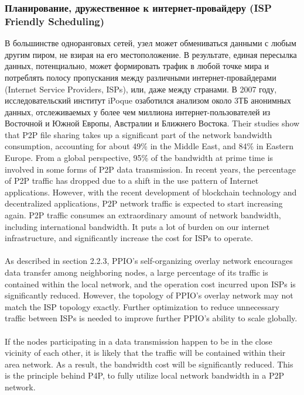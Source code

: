\documentclass[10pt,a4paper]{article}
\begin{document}
\subsubsection{Планирование, дружественное к интернет-провайдеру (ISP Friendly Scheduling)}  %
В большинстве одноранговых сетей, узел может обмениваться данными с любым другим пиром, не взирая на его местоположение. В результате, единая пересылка данных, потенциально, может формировать трафик в любой точке мира и потреблять полосу пропускания между различными интернет-провайдерами (Internet Service Providers, ISPs), или, даже между странами. В 2007 году, исследовательский институт iPoque озаботился анализом около 3ТБ анонимных данных, отслеживаемых у более чем миллиона интернет-пользователей из Восточной и Южной Европы, Австралии и  Ближнего Востока. \cite{article26}Their studies show that P2P file sharing takes up a significant part of the network bandwidth consumption, accounting for about 49\% in the Middle East, and 84\% in Eastern Europe. From a global perspective, 95\% of the bandwidth at prime time is involved in some forms of P2P data transmission. In recent years, the percentage of P2P traffic has dropped due to a shift in the use pattern of Internet applications. However, with the recent development of blockchain technology and decentralized applications, P2P network traffic is expected to start increasing again. P2P traffic consumes an extraordinary amount of network bandwidth, including international bandwidth. It puts a lot of burden on our internet infrastructure, and significantly increase the cost for ISPs to operate.
\vspace{-0.5em}
 \\ \\As described in section 2.2.3, PPIO’s self-organizing overlay network encourages data transfer among neighboring nodes, a large percentage of its traffic is contained within the local network, and the operation cost incurred upon ISPs is significantly reduced. However, the  topology of PPIO’s overlay network may not match the ISP topology exactly. Further optimization to reduce unnecessary traffic between ISPs is needed to improve further PPIO’s ability to scale globally.
 \vspace{-0.5em}
 \\ \\If the nodes participating in a data transmission happen to be in the close vicinity of each other, it is likely that the traffic will be contained within their area network. As a result, the bandwidth cost will be significantly reduced. This is the principle behind P4P, to fully utilize local network bandwidth in a P2P network.  
\end{document}
